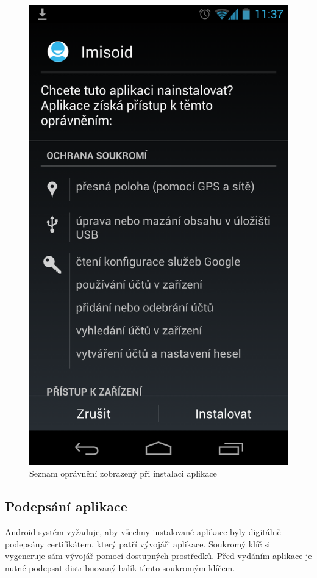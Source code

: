 \documentclass{diplomka}
\begin{document}
\begin{figure}[H]
\begin{minipage}{.45\textwidth}
  \includegraphics[width=.9\linewidth]{scr/install.png}
  \caption{Seznam oprávnění zobrazený při instalaci aplikace}
  \label{fig:install}
\end{minipage}
\end{figure}

\subsection*{Podepsání aplikace}
Android systém vyžaduje, aby všechny instalované aplikace byly digitálně podepsány certifikátem, který patří vývojáři aplikace. Soukromý klíč si vygeneruje sám vývojář pomocí dostupných prostředků. Před vydáním aplikace je nutné podepsat distribuovaný balík tímto soukromým klíčem.
\end{document}
